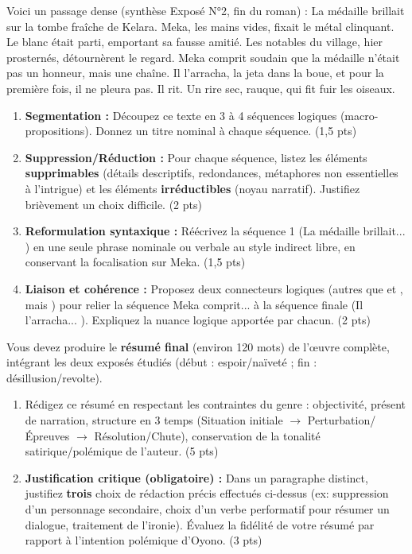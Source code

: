 \documentclass[11pt]{article}
\begin{document}
\begin{exercice}
Voici un passage dense (synthèse Exposé N°2, fin du roman) : 
\og La médaille brillait sur la tombe fraîche de Kelara. Meka, les mains vides, fixait le métal clinquant. Le blanc était parti, emportant sa fausse amitié. Les notables du village, hier prosternés, détournèrent le regard. Meka comprit soudain que la médaille n'était pas un honneur, mais une chaîne. Il l'arracha, la jeta dans la boue, et pour la première fois, il ne pleura pas. Il rit. Un rire sec, rauque, qui fit fuir les oiseaux. \fg{}

\begin{enumerate}
    \item \textbf{Segmentation :} Découpez ce texte en 3 à 4 séquences logiques (macro-propositions). Donnez un titre nominal à chaque séquence. (1,5 pts)
    \item \textbf{Suppression/Réduction :} Pour chaque séquence, listez les éléments \textbf{supprimables} (détails descriptifs, redondances, métaphores non essentielles à l'intrigue) et les éléments \textbf{irréductibles} (noyau narratif). Justifiez brièvement un choix difficile. (2 pts)
    \item \textbf{Reformulation syntaxique :} Réécrivez la séquence 1 (\og La médaille brillait... \fg{}) en une seule phrase nominale ou verbale au style indirect libre, en conservant la focalisation sur Meka. (1,5 pts)
    \item \textbf{Liaison et cohérence :} Proposez deux connecteurs logiques (autres que \og et \fg{}, \og mais \fg{}) pour relier la séquence \og Meka comprit... \fg{} à la séquence finale (\og Il l'arracha... \fg{}). Expliquez la nuance logique apportée par chacun. (2 pts)
\end{enumerate}
\end{exercice}

\begin{exercice}
Vous devez produire le \textbf{résumé final} (environ 120 mots) de l'œuvre complète, intégrant les deux exposés étudiés (début : espoir/naïveté ; fin : désillusion/revolte).

\begin{enumerate}
    \item Rédigez ce résumé en respectant les contraintes du genre : objectivité, présent de narration, structure en 3 temps (Situation initiale $\rightarrow$ Perturbation/Épreuves $\rightarrow$ Résolution/Chute), conservation de la tonalité satirique/polémique de l'auteur. (5 pts)
    \item \textbf{Justification critique (obligatoire) :} Dans un paragraphe distinct, justifiez \textbf{trois} choix de rédaction précis effectués ci-dessus (ex: suppression d'un personnage secondaire, choix d'un verbe performatif pour résumer un dialogue, traitement de l'ironie). Évaluez la fidélité de votre résumé par rapport à l'intention polémique d'Oyono. (3 pts)
\end{enumerate}
\end{exercice}
\end{document}
